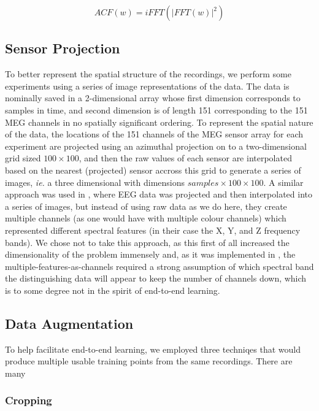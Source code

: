 \documentclass[utf8]{frontiersSCNS} %
\begin{document}

\begin{equation}
  ACF(w) = iFFT(|FFT(w)|^2)
  \label{eq1}
\end{equation}

\subsection{Sensor Projection}

To better represent the spatial structure of the recordings, we perform some experiments using a series of image representations of the data. The data is nominally saved in a 2-dimensional array whose first dimension corresponds to samples in time, and second dimension is of length 151 corresponding to the 151 MEG channels in no spatially significant ordering. To represent the spatial nature of the data, the locations of the 151 channels of the MEG sensor array for each experiment are projected using an azimuthal projection on to a two-dimensional grid sized $100 \times 100$, and then the raw values of each sensor are  interpolated based on the nearest (projected) sensor accross this grid to generate a series of images, \emph{ie.} a three dimensional with dimensions $samples \times  100 \times 100$. A similar approach was used in \cite{}, where EEG data was projected and then interpolated into a series of images, but instead of using raw data as we do here, they create multiple channels (as one would have with multiple colour channels) which represented different spectral features (in their case the X, Y, and Z frequency bands). We chose not to take this approach, as this first of all increased the dimensionality of the problem immensely and, as it was implemented in \cite{}, the multiple-features-as-channels required a strong assumption of which spectral band the distinguishing data will appear to keep the number of channels down, which is to some degree not in the spirit of end-to-end learning.

\subsection{Data Augmentation}

To help facilitate end-to-end learning, we employed three techniqes that would produce multiple usable training points from the same recordings. There are many 

\subsubsection{Cropping}
\end{document}
